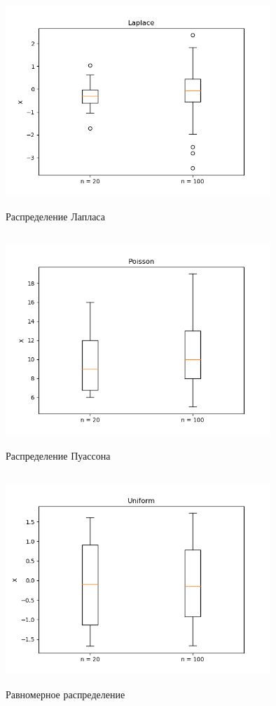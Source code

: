 \documentclass[../body.tex]{subfiles}
\begin{document}
\begin{figure}[H]
	\centering
	\includegraphics[width = 10cm, height = 8cm]{img/Laplace_boxplot.png}
	\caption{Распределение Лапласа}
	\label{fig:laplace_boxplot}
\end{figure}


\begin{figure}[H]
	\centering
	\includegraphics[width = 10cm, height = 8cm]{img/Poisson_boxplot.png}
	\caption{Распределение Пуассона}
	\label{fig:poisson_boxplot}
\end{figure}


\begin{figure}[H]
	\centering
	\includegraphics[width = 10cm, height = 8cm]{img/Uniform_boxplot.png}
	\caption{Равномерное распределение}
	\label{fig:uniform_boxplot}
\end{figure}
\end{document}

